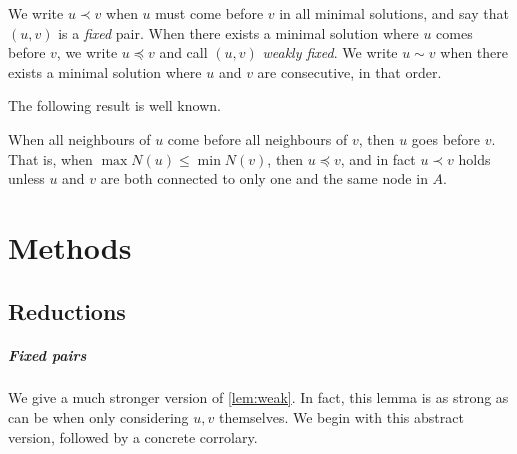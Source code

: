 \documentclass[a4paper,UKenglish,cleveref, autoref, thm-restate]{lipics-v2021}
\renewcommand{\b}{\prec}
\newcommand{\be}{\preceq}
\newcommand{\g}{\sim}
\begin{document}
We write $u\b v$ when $u$ must come before $v$ in all minimal solutions, and say that $(u, v)$
is a \emph{fixed} pair. When there exists a minimal solution where $u$ comes before $v$, we
write $u \be v$ and call $(u, v)$ \emph{weakly fixed}.
We write $u\g v$ when there exists a minimal solution where $u$ and $v$ are
consecutive, in that order.

The following result is well known.

\begin{observation}\label{lem:weak}
  When all neighbours of $u$ come before all neighbours of $v$, then $u$ goes before $v$. That
    is, when $\max N(u) \leq \min N(v)$, then $u\be v$, and in fact $u \b v$ holds
    unless $u$ and $v$ are both connected to only one and the same node in $A$.
\end{observation}

\section{Methods}
\subsection{Reductions}
\subparagraph{Fixed pairs}
We give a much stronger version of \cref{lem:weak}. In fact, this
lemma is as strong as can be when only considering $u, v$ themselves. We begin with this
abstract version, followed by a concrete corrolary.
\end{document}
